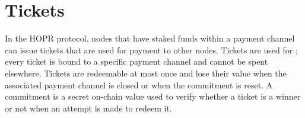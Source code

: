 \section{Tickets}
\label{sec:tickets}



% 

In the HOPR protocol, nodes that have staked funds within a payment channel can issue tickets that are used for payment to other nodes. Tickets are used for ; every ticket is bound to a specific payment channel and cannot be spent elsewhere. Tickets are redeemable at most once and lose their value when the associated payment channel is closed or when the commitment is reset. A commitment is a secret on-chain value used to verify whether a ticket is a winner or not when an attempt is made to redeem it.

